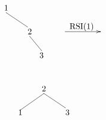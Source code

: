 \documentclass[10pt,a4paper,spanish]{report}
\begin{document}
\begin{minipage}{0.4\textwidth}
\[\begin{xy}
,(0,0)*+=<10mm>[]\txt<2cm>{1}
,(10,-10)*+=<10mm>[]\txt<2cm>{2}
,(32,-8)*+=<20mm>[]\txt<2cm>{RSI(1)}
,(15,-20)*+=<10mm>[]\txt<2cm>{3}

\ar@{-} (0,-2);(9,-8) %
\ar@{->} (25,-10);(40,-10)
\ar@{-} (10,-12);(15,-18) %
\end{xy}\]
\end{minipage}
\begin{minipage}{0.4\textwidth}
\[\begin{xy}
,(0,0)*+=<10mm>[]\txt<2cm>{2}
,(-10,-10)*+=<10mm>[]\txt<2cm>{1}
,(10,-10)*+=<10mm>[]\txt<2cm>{3}

\ar@{-} (0,-2);(-10,-9) %
\ar@{-} (0,-2);(9,-8) %
\end{xy}\]
\end{minipage}
\end{document}
